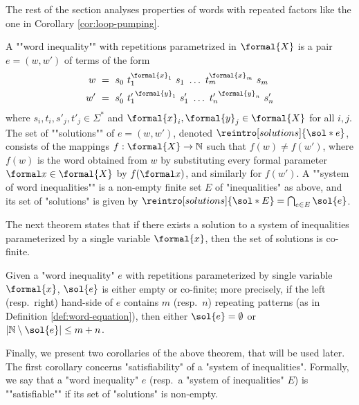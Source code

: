 \documentclass{theoretics}
\begin{document}
The rest of the section analyses properties of words
with repeated factors like the one in Corollary \ref{cor:loop-pumping}.

\begin{definition}\label{def:word-equation}
A ""word inequality"" with repetitions parametrized in 
$\formal{X}$ %
is a pair $e = (w, w')$ of terms of the form
\begin{align*}
w &~=~ s_0 ~ t_1^{\formal{x}_1} ~ s_1 ~ \dots ~ t_m^{\formal{x}_m} ~ s_m \\
w' &~=~ s'_0 ~ {t'_1}^{\formal{y}_1} ~ s'_1 ~ \dots ~
{t'_n}^{\formal{y}_n} ~ {s'_n}
\end{align*}
where $s_i,t_i, s'_j, t'_j \in \Sigma^*$ and 
$\formal{x}_i, \formal{y}_j \in \formal{X}$
for all $i,j$.
\AP
The set of ""solutions"" of $e = (w,w')$, denoted $\reintro[solutions]{\sol*{e}}$, 
consists of the mappings $f:\formal{X}\rightarrow\mathbb{N}$ 
such that $f(w) \neq f(w')$, where $f(w)$ is the word obtained 
from $w$ by substituting every formal parameter $\formal x\in\formal{X}$ 
by $f(\formal x)$, and similarly for $f(w')$.
\AP
A ""system of word inequalities"" 
is a non-empty finite set $E$ of "inequalities" as above,
and its set of "solutions" is given by
$\reintro[solutions]{\sol*{E}} = \bigcap_{e\in E} \sol{e}$.
\end{definition}

The next theorem states that if there exists a solution to a system of inequalities parameterized by a single 
variable $\formal{x}$, then the set of solutions is co-finite. 

\begin{theorem}[name={\cite[Theorem 4.3]{Saarela15}}]\label{thm:saarela}
Given a "word inequality" $e$ with repetitions parameterized by single 
variable $\formal{x}$,
$\sol{e}$ is either empty or co-finite; more precisely,
if the left (resp.~right) hand-side of $e$ contains $m$ (resp.~$n$)
repeating patterns (as in Definition \ref{def:word-equation}),
then either $\sol{e} = \emptyset$ or $|\mathbb{N} \setminus \sol{e}| \le m+n$.
\end{theorem}

Finally, we present two corollaries of the above theorem, 
that will be used later. 
The first corollary concerns "satisfiability" of a "system of inequalities".
\AP
Formally, we say that a "word inequality" $e$ 
(resp.~a "system of inequalities" $E$) 
is ""satisfiable"" if its set of "solutions" is non-empty.
\end{document}
